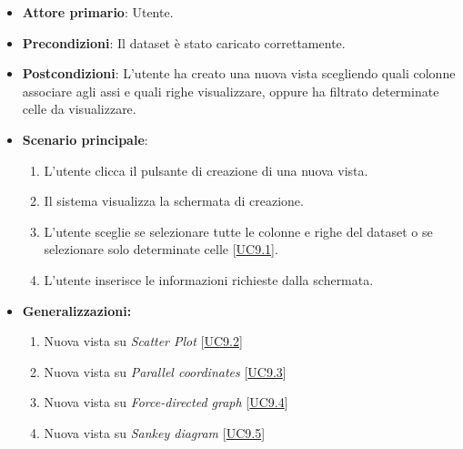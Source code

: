 \begin{itemize}
    \item \textbf{Attore primario}: Utente.
    \item \textbf{Precondizioni}: Il dataset è stato caricato correttamente.
    \item \textbf{Postcondizioni}: L'utente ha creato una nuova vista scegliendo quali colonne associare agli assi e quali righe visualizzare, oppure ha filtrato determinate celle da visualizzare.
    \item \textbf{Scenario principale}:
          \begin{enumerate}
              \item L'utente clicca il pulsante di creazione di una nuova vista.
              \item Il sistema visualizza la schermata di creazione.
              \item L'utente sceglie se selezionare tutte le colonne e righe del dataset o se selezionare solo determinate celle [\hyperref[sec:UC9.1]{UC9.1}].
              \item L'utente inserisce le informazioni richieste dalla schermata.
          \end{enumerate}
  \item \textbf{Generalizzazioni:} \begin{enumerate}
                                        \item Nuova vista su \textit{Scatter Plot}		 
[\hyperref[sec:UC9.2]{UC9.2}]
                                        \item Nuova vista su \textit{Parallel coordinates} [\hyperref[sec:UC9.3]{UC9.3}]
                                        \item Nuova vista su \textit{Force-directed graph} [\hyperref[sec:UC9.4]{UC9.4}]
                                        \item Nuova vista su \textit{Sankey diagram} [\hyperref[sec:UC9.5]{UC9.5}]
                                    \end{enumerate}
\end{itemize}



